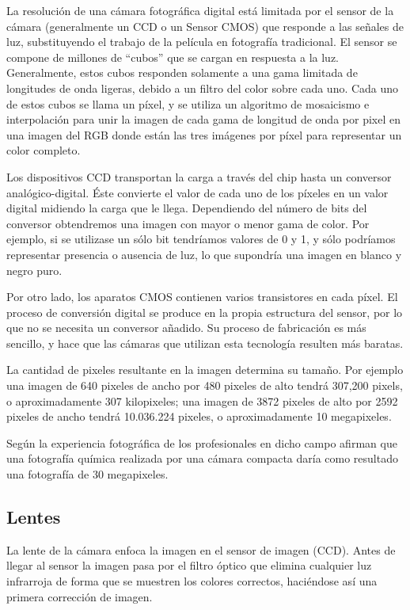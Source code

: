 \documentclass[12pt,a4papert,woside,openright,titlepage,final]{book}
\begin{document}
La resolución de una cámara fotográfica digital está limitada por el sensor de
la cámara (generalmente un CCD o un Sensor CMOS) que responde a las señales de
luz, substituyendo el trabajo de la película en fotografía tradicional. El
sensor se compone de millones de “cubos” que se cargan en respuesta a la luz.
Generalmente, estos cubos responden solamente a una gama limitada de longitudes
de onda ligeras, debido a un filtro del color sobre cada uno. Cada uno de estos
cubos se llama un píxel, y se utiliza un algoritmo de mosaicismo e interpolación
para unir la imagen de cada gama de longitud de onda por pixel en una imagen del
RGB donde están las tres imágenes por píxel para representar un color completo.

Los dispositivos CCD transportan la carga a través del chip hasta un conversor
analógico-digital. Éste convierte el valor de cada uno de los píxeles en un
valor digital midiendo la carga que le llega. Dependiendo del número de bits del
conversor obtendremos una imagen con mayor o menor gama de color. Por ejemplo,
si se utilizase un sólo bit tendríamos valores de 0 y 1, y sólo podríamos
representar presencia o ausencia de luz, lo que supondría una imagen en blanco y
negro puro.

Por otro lado, los aparatos CMOS contienen varios transistores en cada píxel. El
proceso de conversión digital se produce en la propia estructura del sensor, por
lo que no se necesita un conversor añadido. Su proceso de fabricación es más
sencillo, y hace que las cámaras que utilizan esta tecnología resulten más
baratas.

La cantidad de pixeles resultante en la imagen determina su tamaño. Por ejemplo
una imagen de 640 pixeles de ancho por 480 pixeles de alto tendrá 307,200
pixels, o aproximadamente 307 kilopixeles; una imagen de 3872 pixeles de alto
por 2592 pixeles de ancho tendrá 10.036.224 pixeles, o aproximadamente 10
megapixeles.

Según la experiencia fotográfica de los profesionales en dicho campo afirman que
una fotografía química realizada por una cámara compacta daría como resultado
una fotografía de 30 megapixeles.

\subsection{Lentes}

La lente de la cámara enfoca la imagen en el sensor de imagen
(CCD). Antes de llegar al sensor la imagen pasa por el filtro óptico que
elimina cualquier luz infrarroja de forma que se muestren los colores
correctos, haciéndose así una primera corrección de imagen.
\end{document}
